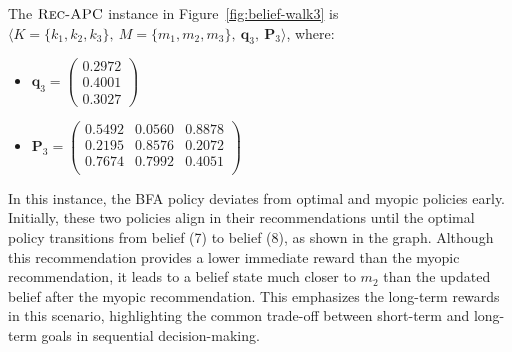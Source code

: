 \begin{example} \label{example:3}
The $\textsc{Rec-APC}$ instance in Figure~\ref{fig:belief-walk3} is $\langle K = \{ k_1, k_2, k_3 \},\ M = \{ m_1, m_2, m_3 \},\ \bm{q}_3,\ \bm{P}_3 \rangle$, where:
\begin{itemize}
\item $\bm{q}_3 = \begin{pmatrix} 0.2972 \\ 0.4001 \\ 0.3027 \end{pmatrix}$
\item $\bm{P}_3 = \begin{pmatrix} 0.5492 & 0.0560 & 0.8878 \\ 0.2195 & 0.8576 & 0.2072 \\ 0.7674 & 0.7992 & 0.4051 \\ \end{pmatrix}$
\end{itemize}
In this instance, the BFA policy deviates from optimal and myopic policies early. Initially, these two policies align in their recommendations until the optimal policy transitions from belief (7) to belief (8), as shown in the graph. Although this recommendation provides a lower immediate reward than the myopic recommendation, it leads to a belief state much closer to $m_2$ than the updated belief after the myopic recommendation. This emphasizes the long-term rewards in this scenario, highlighting the common trade-off between short-term and long-term goals in sequential decision-making.
\end{example}

